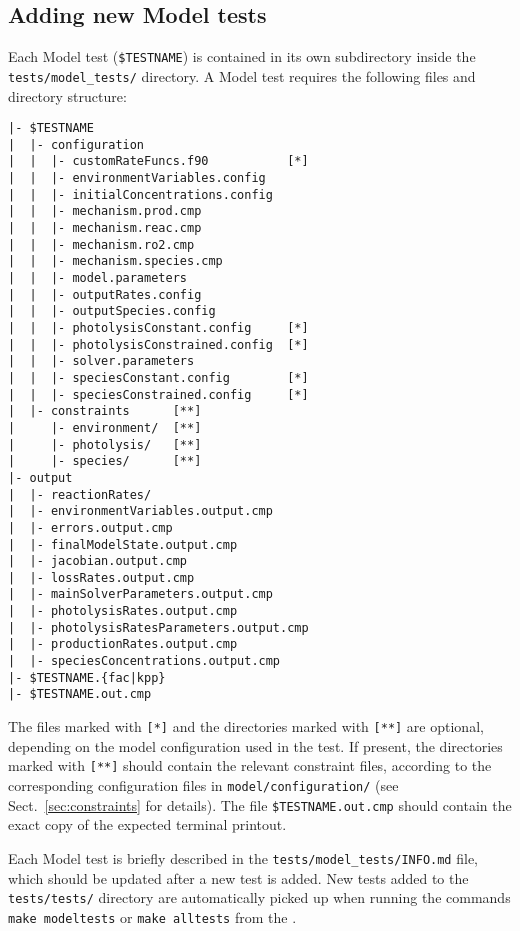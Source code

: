 \subsection{Adding new Model tests} \label{subsec:adding-new-model-tests}

Each Model test (\texttt{\$TESTNAME}) is contained in its own
subdirectory inside the \texttt{tests/model\_tests/} directory. A
Model test requires the following files and directory structure:

\begin{verbatim}
|- $TESTNAME
|  |- configuration
|  |  |- customRateFuncs.f90           [*]
|  |  |- environmentVariables.config
|  |  |- initialConcentrations.config
|  |  |- mechanism.prod.cmp
|  |  |- mechanism.reac.cmp
|  |  |- mechanism.ro2.cmp
|  |  |- mechanism.species.cmp
|  |  |- model.parameters
|  |  |- outputRates.config
|  |  |- outputSpecies.config
|  |  |- photolysisConstant.config     [*]
|  |  |- photolysisConstrained.config  [*]
|  |  |- solver.parameters
|  |  |- speciesConstant.config        [*]
|  |  |- speciesConstrained.config     [*]
|  |- constraints      [**]
|     |- environment/  [**]
|     |- photolysis/   [**]
|     |- species/      [**]
|- output
|  |- reactionRates/
|  |- environmentVariables.output.cmp
|  |- errors.output.cmp
|  |- finalModelState.output.cmp
|  |- jacobian.output.cmp
|  |- lossRates.output.cmp
|  |- mainSolverParameters.output.cmp
|  |- photolysisRates.output.cmp
|  |- photolysisRatesParameters.output.cmp
|  |- productionRates.output.cmp
|  |- speciesConcentrations.output.cmp
|- $TESTNAME.{fac|kpp}
|- $TESTNAME.out.cmp
\end{verbatim}

The files marked with \texttt{[*]} and the directories marked with
\texttt{[**]} are optional, depending on the model configuration used
in the test. If present, the directories marked with \texttt{[**]}
should contain the relevant constraint files, according to the
corresponding configuration files in \texttt{model/configuration/}
(see Sect.~\ref{sec:constraints} for details). The file
\texttt{\$TESTNAME.out.cmp} should contain the exact copy of the
expected terminal printout.

Each Model test is briefly described in the \texttt{tests/model\_tests/INFO.md}
file, which should be updated after a new test is added. New tests added
to the \texttt{tests/tests/} directory are automatically picked up when
running the commands \verb|make modeltests| or \verb|make alltests| from
the \maindir.

